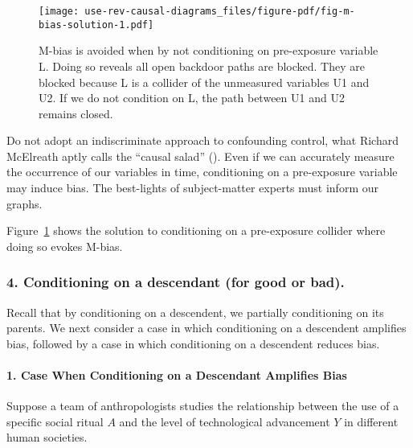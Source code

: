 \documentclass[
  singlecolumn,
  9pt]{article}
\let\oldparagraph\paragraph
\renewcommand{\paragraph}[1]{\oldparagraph{#1}\mbox{}}
\begin{document}
\begin{figure}

{\centering \texttt{[image: use-rev-causal-diagrams\_files/figure-pdf/fig-m-bias-solution-1.pdf]}

}

\caption{\label{fig-m-bias-solution}M-bias is avoided when by not
conditioning on pre-exposure variable L. Doing so reveals all open
backdoor paths are blocked. They are blocked because L is a collider of
the unmeasured variables U1 and U2. If we do not condition on L, the
path between U1 and U2 remains closed.}

\end{figure}

Do not adopt an indiscriminate approach to confounding control, what
Richard McElreath aptly calls the ``causal salad''
(). Even if we can
accurately measure the occurrence of our variables in time, conditioning
on a pre-exposure variable may induce bias. The best-lights of
subject-matter experts must inform our graphs.

Figure~\ref{fig-m-bias-solution} shows the solution to conditioning on a
pre-exposure collider where doing so evokes M-bias.

\subsubsection{4. Conditioning on a descendant (for good or
bad).}\label{conditioning-on-a-descendant-for-good-or-bad.}

Recall that by conditioning on a descendent, we partially conditioning
on its parents. We next consider a case in which conditioning on a
descendent amplifies bias, followed by a case in which conditioning on a
descendent reduces bias.

\paragraph{1. Case When Conditioning on a Descendant Amplifies
Bias}\label{case-when-conditioning-on-a-descendant-amplifies-bias}

Suppose a team of anthropologists studies the relationship between the
use of a specific social ritual \(A\) and the level of technological
advancement \(Y\) in different human societies.
\end{document}
